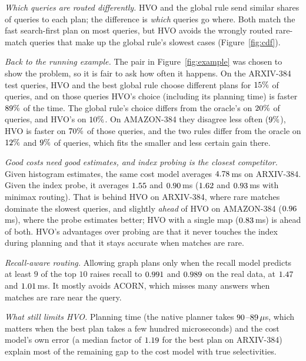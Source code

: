 \documentclass[sigconf, nonacm]{acmart}
\begin{document}
\emph{Which queries are routed differently.} HVO and the global rule send similar shares of queries to each plan; the difference is \emph{which} queries go where. Both match the fast search-first plan on most queries, but HVO avoids the wrongly routed rare-match queries that make up the global rule's slowest cases (Figure~\ref{fig:cdf}).

\emph{Back to the running example.} The pair in Figure~\ref{fig:example} was chosen to show the problem, so it is fair to ask how often it happens. On the ARXIV-384 test queries, HVO and the best global rule choose different plans for $15\%$ of queries, and on those queries HVO's choice (including its planning time) is faster $89\%$ of the time. The global rule's choice differs from the oracle's on $20\%$ of queries, and HVO's on $10\%$. On AMAZON-384 they disagree less often ($9\%$), HVO is faster on $70\%$ of those queries, and the two rules differ from the oracle on $12\%$ and $9\%$ of queries, which fits the smaller and less certain gain there.

\emph{Good costs need good estimates, and index probing is the closest competitor.} Given histogram estimates, the same cost model averages $4.78$\,ms on ARXIV-384. Given the index probe, it averages $1.55$ and $0.90$\,ms ($1.62$ and $0.93$\,ms with minimax routing). That is behind HVO on ARXIV-384, where rare matches dominate the slowest queries, and slightly \emph{ahead} of HVO on AMAZON-384 ($0.96$\,ms), where the probe estimates better; HVO with a single map ($0.83$\,ms) is ahead of both. HVO's advantages over probing are that it never touches the index during planning and that it stays accurate when matches are rare.

\emph{Recall-aware routing.} Allowing graph plans only when the recall model predicts at least $9$ of the top $10$ raises recall to $0.991$ and $0.989$ on the real data, at $1.47$ and $1.01$\,ms. It mostly avoids ACORN, which misses many answers when matches are rare near the query.

\emph{What still limits HVO.} Planning time (the native planner takes $90$--$89\,\mu$s, which matters when the best plan takes a few hundred microseconds) and the cost model's own error (a median factor of $1.19$ for the best plan on ARXIV-384) explain most of the remaining gap to the cost model with true selectivities.
\end{document}
